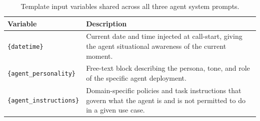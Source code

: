 \begin{table}[h]
\centering
\small
\caption{Template input variables shared across all three agent system prompts.}
\label{tab:prompt-variables}
\begin{tabular}{lp{9.5cm}}
\toprule
\textbf{Variable} & \textbf{Description} \\
\midrule
\texttt{\{datetime\}}            & Current date and time injected at call-start, giving the agent situational awareness of the current moment. \\
\texttt{\{agent\_personality\}}  & Free-text block describing the persona, tone, and role of the specific agent deployment. \\
\texttt{\{agent\_instructions\}} & Domain-specific policies and task instructions that govern what the agent is and is not permitted to do in a given use case. \\
\bottomrule
\end{tabular}
\end{table}
